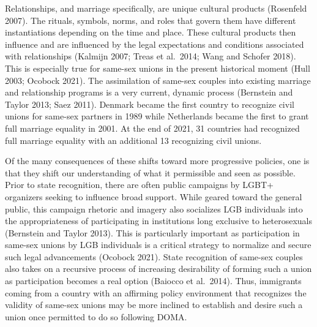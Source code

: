 \documentclass[
  12pt,
]{article}
\begin{document}
Relationships, and marriage specifically, are unique cultural products (Rosenfeld 2007). The rituals, symbols, norms, and roles that govern them have different instantiations depending on the time and place. These cultural products then influence and are influenced by the legal expectations and conditions associated with relationships (Kalmijn 2007; Treas et al.~2014; Wang and Schofer 2018). This is especially true for same-sex unions in the present historical moment (Hull 2003; Ocobock 2021). The assimilation of same-sex couples into existing marriage and relationship programs is a very current, dynamic process (Bernstein and Taylor 2013; Saez 2011). Denmark became the first country to recognize civil unions for same-sex partners in 1989 while Netherlands became the first to grant full marriage equality in 2001. At the end of 2021, 31 countries had recognized full marriage equality with an additional 13 recognizing civil unions.

Of the many consequences of these shifts toward more progressive policies, one is that they shift our understanding of what it permissible and seen as possible. Prior to state recognition, there are often public campaigns by LGBT+ organizers seeking to influence broad support. While geared toward the general public, this campaign rhetoric and imagery also socializes LGB individuals into the appropriateness of participating in institutions long exclusive to heterosexuals (Bernstein and Taylor 2013). This is particularly important as participation in same-sex unions by LGB individuals is a critical strategy to normalize and secure such legal advancements (Ocobock 2021). State recognition of same-sex couples also takes on a recursive process of increasing desirability of forming such a union as participation becomes a real option (Baiocco et al.~2014). Thus, immigrants coming from a country with an affirming policy environment that recognizes the validity of same-sex unions may be more inclined to establish and desire such a union once permitted to do so following DOMA.
\end{document}
